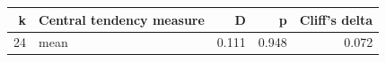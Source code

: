 \begin{tabular}{rlrrr}
\toprule
k & Central tendency measure & D & p & Cliff's delta \\
\midrule
24 & mean & 0.111 & 0.948 & 0.072 \\
\bottomrule
\end{tabular}
